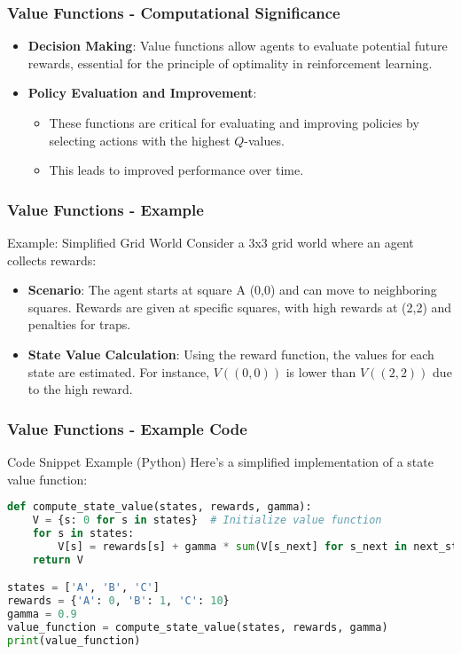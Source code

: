\documentclass[aspectratio=169]{beamer}
\begin{document}
\begin{frame}[fragile]
    \frametitle{Value Functions - Computational Significance}
    \begin{itemize}
        \item \textbf{Decision Making}: 
        Value functions allow agents to evaluate potential future rewards, essential for the principle of optimality in reinforcement learning.

        \item \textbf{Policy Evaluation and Improvement}:
        \begin{itemize}
            \item These functions are critical for evaluating and improving policies by selecting actions with the highest \( Q \)-values.
            \item This leads to improved performance over time.
        \end{itemize}
    \end{itemize}
\end{frame}

\begin{frame}[fragile]
    \frametitle{Value Functions - Example}
    \begin{block}{Example: Simplified Grid World}
        Consider a 3x3 grid world where an agent collects rewards:
        \begin{itemize}
            \item \textbf{Scenario}:
            The agent starts at square A (0,0) and can move to neighboring squares. Rewards are given at specific squares, with high rewards at (2,2) and penalties for traps.
            \item \textbf{State Value Calculation}: 
            Using the reward function, the values for each state are estimated. 
            For instance, \( V((0,0)) \) is lower than \( V((2,2)) \) due to the high reward.
        \end{itemize}
    \end{block}
\end{frame}

\begin{frame}[fragile]
    \frametitle{Value Functions - Example Code}
    \begin{block}{Code Snippet Example (Python)}
        Here’s a simplified implementation of a state value function:
        \begin{lstlisting}[language=Python]
def compute_state_value(states, rewards, gamma):
    V = {s: 0 for s in states}  # Initialize value function
    for s in states:
        V[s] = rewards[s] + gamma * sum(V[s_next] for s_next in next_states(s))
    return V

states = ['A', 'B', 'C']
rewards = {'A': 0, 'B': 1, 'C': 10}
gamma = 0.9
value_function = compute_state_value(states, rewards, gamma)
print(value_function)
        \end{lstlisting}
    \end{block}
\end{frame}
\end{document}
